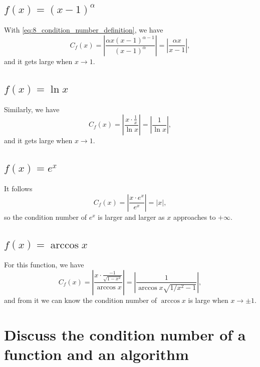 \documentclass[a4paper]{article}
\begin{document}
\subsection{$f(x) = (x - 1)^{\alpha}$}

With \cref{eq:8_condition_number_definition}, we have 
\begin{equation}
    C_f(x) = \left|\frac{\alpha x(x - 1)^{\alpha - 1}}{(x - 1)^{\alpha}}\right| = \left|\frac{\alpha x}{x - 1}\right|,
    \label{eq:8_condition_number_1}
\end{equation}
and it gets large when $x \to 1$.

\subsection{$f(x) = \ln x$}

Similarly, we have 
\begin{equation}
    C_f(x) = \left|\frac{x \cdot \frac{1}{x}}{\ln x}\right| = \left|\frac{1}{\ln x}\right|,
    \label{eq:8_condition_number_2}
\end{equation}
and it gets large when $x \to 1$.

\subsection{$f(x) = e^x$}

It follows 
\begin{equation}
    C_f(x) = \left|\frac{x \cdot e^x}{e^x}\right| = |x|,
    \label{eq:8_condition_number_3}
\end{equation}
so the condition number of $e^x$ is larger and larger as $x$ approaches to $+\infty$.

\subsection{$f(x) = \arccos x$}

For this function, we have 
\begin{equation}
    C_f(x) = \left|\frac{x \cdot \frac{-1}{\sqrt{1 - x^2}}}{\arccos x}\right| = \left|\frac{1}{\arccos x \sqrt{1/x^2 - 1}}\right|,
    \label{eq:8_condition_number_4}
\end{equation}
and from it we can know the condition number of $\arccos x$ is large when $x \to \pm 1$.

\section{Discuss the condition number of a function and an algorithm}
\end{document}
